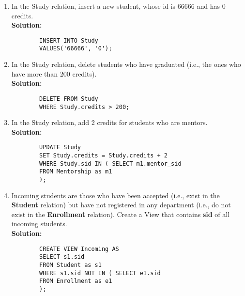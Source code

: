 \documentclass[paper=a4, fontsize=11pt]{scrartcl}
\numberwithin{equation}{section}		%
\numberwithin{figure}{section}			%
\numberwithin{table}{section}				%
\begin{document}
	\begin{enumerate}
		\item In the Study relation, insert a new student, whose id is 66666 and has 0 credits.\\
		\textbf{Solution: }
		\begin{lstlisting}
		INSERT INTO Study
		VALUES('66666', '0');
		\end{lstlisting}
		
		\item In the Study relation, delete students who have graduated (i.e., the ones who have more than 200 credits).\\
		\textbf{Solution: }
		\begin{lstlisting}
		DELETE FROM Study
		WHERE Study.credits > 200;
		\end{lstlisting}
		
		\item In the Study relation, add 2 credits for students who are mentors.\\
		\textbf{Solution: }
		\begin{lstlisting}
		UPDATE Study
		SET Study.credits = Study.credits + 2
		WHERE Study.sid IN ( SELECT m1.mentor_sid
		FROM Mentorship as m1
		);
		\end{lstlisting}
		
		\item Incoming students are those who have been accepted (i.e., exist in the \textbf{Student} relation) but have not registered in any department (i.e., do not exist in the \textbf{Enrollment} relation). Create a View that contains \textbf{sid} of all incoming students.\\
		\textbf{Solution: }
		\begin{lstlisting}
		CREATE VIEW Incoming AS
		SELECT s1.sid
		FROM Student as s1
		WHERE s1.sid NOT IN ( SELECT e1.sid
		FROM Enrollment as e1
		);
		\end{lstlisting}
		
	\end{enumerate}
	
	
	
\end{document}
